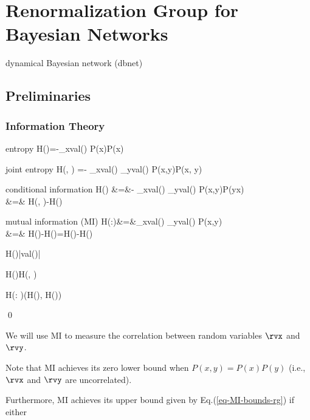 \chapter{Renormalization Group for Bayesian Networks}
\label{ch-renorm-group-bnets}

dynamical Bayesian network (dbnet)

\section{Preliminaries}
\subsection{Information Theory}

entropy 
\beq
H(\rvx)=-\sum_{x\in val(\rvx)} P(x)\ln P(x)
\eeq

joint entropy
\beq
H(\rvx, \rvy) =-
\sum_{x\in val(\rvx)}
\sum_{y\in val(\rvy)}
P(x,y)\ln P(x, y)
\eeq

conditional information
\beqa
H(\rvy\mid \rvx) &=&-
\sum_{x\in val(\rvx)}
\sum_{y\in val(\rvy)}
P(x,y)\ln P(y\mid x)
\\
&=&
H(\rvx, \rvy)-H(\rvx)
\eeqa

mutual information (MI)
\beqa
H(\rvx:\rvy)&=&\sum_{x\in val(\rvx)}
\sum_{y\in val(\rvy)}
P(x,y)\ln {}
\\
&=& H(\rvy)-H(\rvy\mid\rvx)=H(\rvx)-H(\rvx\mid\rvy)
\eeqa


\begin{claim}
\leq H(\rvx)\leq \ln|val(\rvx)|
\eeq

\leq H(\rvy\mid \rvx)\leq H(\rvx, \rvy)
\eeq

\leq H(\rvx: \rvy)\leq \min(H(\rvx), H(\rvy))
\label{eq-MI-bounds-rg}
\eeq
\end{claim}
\proof
\qed

We will use MI to
measure the correlation
between random variables $\rvx$ and $\rvy$.

Note that MI achieves its zero
lower bound
when $P(x,y)=P(x)P(y)$
(i.e., $\rvx$ and $\rvy$ are uncorrelated).

Furthermore, MI achieves its 
upper bound given by Eq.(\ref{eq-MI-bounds-rg})
if either 

